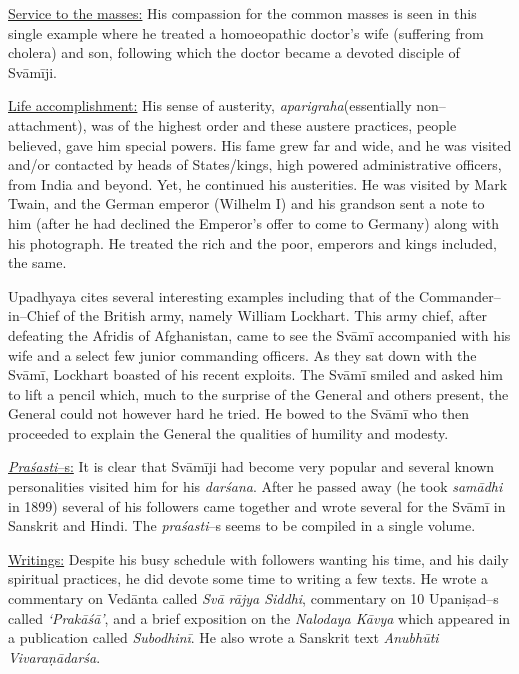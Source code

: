 \underline{Service to the masses:} His compassion for the common masses is seen in this single example where he treated a homoeopathic doctor’s wife (suffering from cholera) and son, following which the doctor became a devoted disciple of Svāmīji.

\underline{Life accomplishment:} His sense of austerity, \textit{aparigraha}(essentially non–attachment), was of the highest order and these austere practices, people believed, gave him special powers. His fame grew far and wide, and he was visited and/or contacted by heads of States/kings, high powered administrative officers, from India and beyond. Yet, he continued his austerities. He was visited by Mark Twain, and the German emperor (Wilhelm I) and his grandson sent a note to him (after he had declined the Emperor’s offer to come to Germany) along with his photograph. He treated the rich and the poor, emperors and kings included, the same.

Upadhyaya cites several interesting examples including that of the Commander–in–Chief of the British army, namely William Lockhart. This army chief, after defeating the Afridis of Afghanistan, came to see the Svāmī accompanied with his wife and a select few junior commanding officers. As they sat down with the Svāmī, Lockhart boasted of his recent exploits. The Svāmī smiled and asked him to lift a pencil which, much to the surprise of the General and others present, the General could not however hard he tried. He bowed to the Svāmī who then proceeded to explain the General the qualities of humility and modesty.

\underline{\textit{Praśasti}–s:} It is clear that Svāmīji had become very popular and several known personalities visited him for his \textit{darśana}. After he passed away (he took \textit{samādhi} in 1899) several of his followers came together and wrote several for the Svāmī in Sanskrit and Hindi. The \textit{praśasti}–s seems to be compiled in a single volume.

\underline{Writings:} Despite his busy schedule with followers wanting his time, and his daily spiritual practices, he did devote some time to writing a few texts. He wrote a commentary on Vedānta called \textit{Svā rājya Siddhi}, commentary on 10 Upaniṣad–s called \textit{‘Prakāśā’}, and a brief exposition on the \textit{Nalodaya Kāvya} which appeared in a publication called \textit{Subodhinī}. He also wrote a Sanskrit text \textit{Anubhūti Vivaraṇādarśa}.

